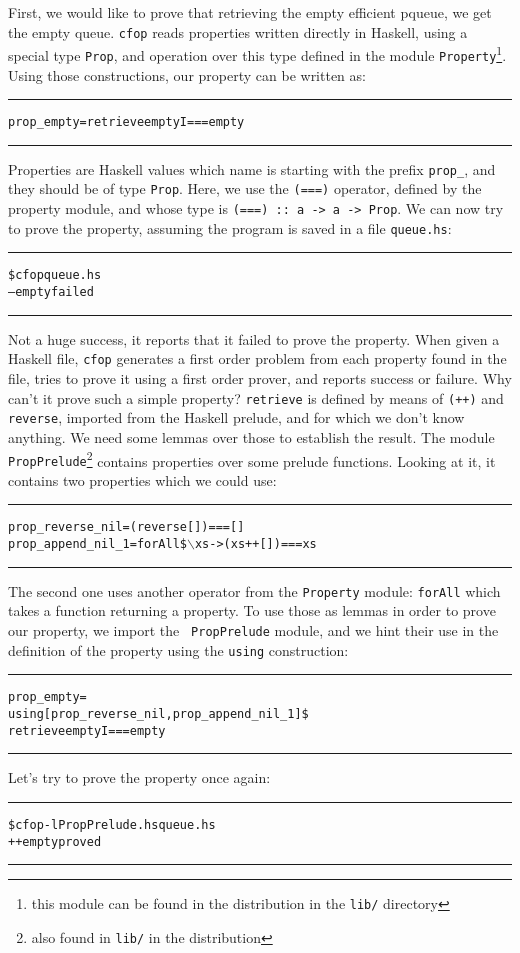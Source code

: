 \documentclass{article}
\newenvironment{shellcode}
  {\begin{alltt}\rule{7cm}{1pt}}
  {\rule{7cm}{1pt}\end{alltt}}
\newcommand{\cfop}{{\tt cfop}\xspace}
\begin{document}
First, we would like to prove that retrieving the empty efficient
pqueue, we get the empty queue. \cfop reads properties written directly
in {\sc Haskell}, using a special type {\tt Prop}, and operation over
this type defined in the module {\tt Property}\footnote{this module
can be found in the distribution in the {\tt lib/} directory}. Using
those constructions, our property can be written as:
\begin{shellcode}
prop_empty = retrieve emptyI === empty
\end{shellcode}
Properties are {\sc Haskell} values which name is starting with the
prefix {\tt prop\_}, and they should be of type {\tt Prop}. Here, we
use the {\tt (===)} operator, defined by the property module, and
whose type is {\tt (===) :: a -> a -> Prop}. We can now try to prove
the property, assuming the program is saved in a file {\tt queue.hs}:
\begin{shellcode}
\$ {\color{red}cfop queue.hs}
-- empty failed
\end{shellcode}
Not a huge success, it reports that it failed to prove the
property. When given a {\sc Haskell} file, \cfop generates a first
order problem from each property found in the file, tries to prove it
using a first order prover, and reports success or failure. Why can't
it prove such a simple property? {\tt retrieve} is defined by means of
{\tt (++)} and {\tt reverse}, imported from the Haskell prelude, and
for which we don't know anything. We need some lemmas over those to
establish the result. The module {\tt PropPrelude}\footnote{also found
in {\tt lib/} in the distribution} contains properties over some
prelude functions. Looking at it, it contains two properties which we
could use:
\begin{shellcode}
prop_reverse_nil  = (reverse []) ===  []
prop_append_nil_1 = forAll \$ \(\backslash\)xs -> ( xs ++ [] ) ===  xs 
\end{shellcode}
The second one uses another operator from the {\tt Property} module:
{\tt forAll} which takes a function returning a property. To use those
as lemmas in order to prove our property, we import the {\tt
PropPrelude} module, and we hint their use in the definition of the
property using the {\tt using} construction:
\begin{shellcode}
prop_empty = 
    using [ prop_reverse_nil, prop_append_nil_1 ] \$
    retrieve emptyI === empty
\end{shellcode}
Let's try to prove the property once again:
\begin{shellcode}
\$ {\color{red}cfop -l PropPrelude.hs queue.hs}
++ empty proved
\end{shellcode}
\end{document}
